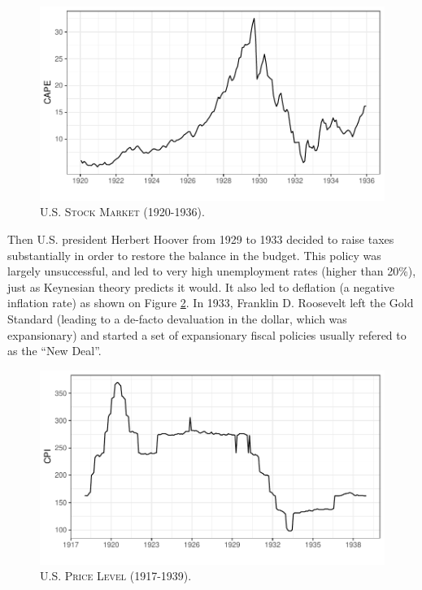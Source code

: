 \documentclass[]{book}
\begin{document}
\begin{figure}

{\centering \includegraphics[width=0.8\linewidth,height=0.8\textheight]{figures/stock-market-1920-1936} 

}

\caption{\textsc{U.S. Stock Market (1920-1936).}}\label{fig:stock-market-1920-1936}
\end{figure}

Then U.S. president Herbert Hoover from 1929 to 1933 decided to raise
taxes substantially in order to restore the balance in the budget. This
policy was largely unsuccessful, and led to very high unemployment rates
(higher than 20\%), just as Keynesian theory predicts it would. It also
led to deflation (a negative inflation rate) as shown on Figure
\ref{fig:gold-standard-1917-1938}. In 1933, Franklin D. Roosevelt left
the Gold Standard (leading to a de-facto devaluation in the dollar,
which was expansionary) and started a set of expansionary fiscal
policies usually refered to as the ``New Deal''.



\begin{figure}

{\centering \includegraphics[width=0.8\linewidth,height=0.8\textheight]{figures/gold-standard-1917-1938} 

}

\caption{\textsc{U.S. Price Level (1917-1939).}}\label{fig:gold-standard-1917-1938}
\end{figure}
\end{document}
